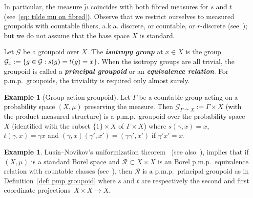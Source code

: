 \documentclass[10pt]{amsart}
\theoremstyle{definition}
\newtheorem{exam}[cdrthm]{Example}
\newcommand{\defin}[1]{\textbf{\emph{#1}}}
\newcommand{\acting}{\curvearrowright}
\newcommand{\RR}{\mathcal{R}}
\newcommand{\cg}{\mathcal{G}}
\newcommand{\pmp}{p.m.p.\ }
\begin{document}
In particular, the measure $\widetilde{\mu}$ coincides with both fibred measures for $s$ and $t$ (see~\eqref{eq: tilde mu on fibred}). Observe that we restrict ourselves to measured groupoids with countable fibers, a.k.a. discrete, or countable, or $r$-discrete (see~\cite{2000-Anantharaman-Renault-Amen-gpoids}); but we do not assume that the base space $X$ is standard.



Let $\cg$ be a groupoid over $X$. The
\defin{isotropy group} at $x\in X$ is the group $\cg_x \linebreak:=\{g\in\cg: s(g)=t(g)=x\}$. When the isotropy groups are all trivial, the groupoid is called a
\defin{principal groupoid} or an
\defin{equivalence relation}. For \pmp groupoids, the triviality is required only almost surely.

\begin{exam}[Group action groupoid]\label{ex: groupoid from pmp action}
Let $\Gamma$ be a countable group acting on a probability space $(X,\mu)$ preserving the measure. Then $\cg_{\Gamma\acting X}:=\Gamma \times X$ (with the product measured structure) is a \pmp groupoid over the probability space $X$ (identified with the subset $\{1\}\times X$ of $\Gamma \times X$) where $s(\gamma,x)=x$, $t(\gamma,x)=\gamma x$ and $(\gamma,x)(\gamma',x')=(\gamma\gamma',x')$ if $\gamma'x'=x$.
\end{exam}


\begin{exam}
Lusin--Novikov's uniformization theorem~\cite{Lusin-Novikoff-1935} (see also~\cite[Theorem~18.10]{Kechris-class-descr-th-1995}), implies that if $(X,\mu)$ is a standard Borel space and $\RR\subset X \times X$ is an Borel \pmp equivalence relation with countable classes (see~\cite{FeldmanMoore-1977}), then $\RR$ is a \pmp principal groupoid as in Definition~\ref{def: pmp groupoid} where $s$ and $t$ are respectively the second and first coordinate projections~$X \times X \to X$.
\end{exam}
\end{document}
